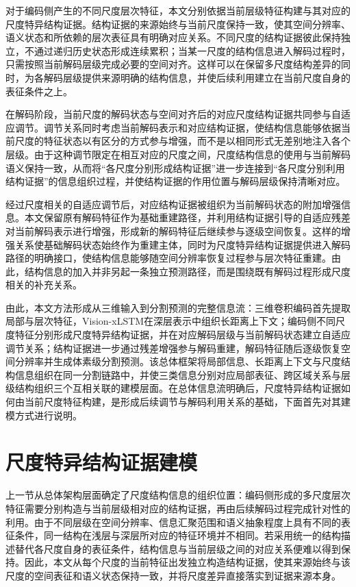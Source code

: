 对于编码侧产生的不同尺度层次特征，本文分别依据当前层级特征构建与其对应的尺度特异结构证据。结构证据的来源始终与当前尺度保持一致，使其空间分辨率、语义状态和所依赖的层次表征具有明确对应关系。不同尺度的结构证据彼此保持独立，不通过递归历史状态形成连续累积；当某一尺度的结构信息进入解码过程时，只需按照当前解码层级完成必要的空间对齐。这样可以在保留多尺度结构差异的同时，为各解码层级提供来源明确的结构信息，并使后续利用建立在当前尺度自身的表征条件之上。

在解码阶段，当前尺度的解码状态与空间对齐后的对应尺度结构证据共同参与自适应调节。调节关系同时考虑当前解码表示和对应结构证据，使结构信息能够依据当前尺度的特征状态以有区分的方式参与增强，而不是以相同形式无差别地注入各个层级。由于这种调节限定在相互对应的尺度之间，尺度结构信息的使用与当前解码语义保持一致，从而将“各尺度分别形成结构证据”进一步连接到“各尺度分别利用结构证据”的信息组织过程，并使结构证据的作用位置与解码层级保持清晰对应。

经过尺度相关的自适应调节后，对应结构证据被组织为当前解码状态的附加增强信息。本文保留原有解码特征作为基础重建路径，并利用结构证据引导的自适应残差对当前解码表示进行增强，形成新的解码特征后继续参与逐级空间恢复。这样的增强关系使基础解码状态始终作为重建主体，同时为尺度特异结构证据提供进入解码路径的明确接口，使结构信息能够随空间分辨率恢复过程参与层次特征重建。由此，结构信息的加入并非另起一条独立预测路径，而是围绕既有解码过程形成尺度相关的补充关系。

由此，本文方法形成从三维输入到分割预测的完整信息流：三维卷积编码首先提取局部与层次特征，Vision-xLSTM在深层表示中组织长距离上下文；编码侧不同尺度特征分别形成尺度特异结构证据，并在对应解码层级与当前解码状态建立自适应调节关系；结构证据进一步通过残差增强参与解码重建，解码特征随后逐级恢复空间分辨率并生成体素级分割预测。该总体框架将局部信息、长距离上下文与尺度结构信息组织在同一分割链路中，并使三类信息分别对应局部表征、跨区域关系与层级结构组织三个互相关联的建模层面。在总体信息流明确后，尺度特异结构证据如何由当前尺度特征构建，是形成后续调节与解码利用关系的基础，下面首先对其建模方式进行说明。

\section{尺度特异结构证据建模}

上一节从总体架构层面确定了尺度结构信息的组织位置：编码侧形成的多尺度层次特征需要分别构造与当前层级相对应的结构证据，再由后续解码过程完成针对性的利用。由于不同层级在空间分辨率、信息汇聚范围和语义抽象程度上具有不同的表征条件，同一结构在浅层与深层所对应的特征环境并不相同。若采用统一的结构描述替代各尺度自身的表征条件，结构信息与当前层级之间的对应关系便难以得到保持。因此，本文从每个尺度的当前特征出发独立构造结构证据，使其来源始终与该尺度的空间表征和语义状态保持一致，并将尺度差异直接落实到证据来源本身。

